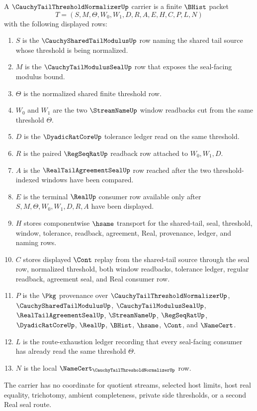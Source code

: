 \begin{definition}
\label{def:cauchy-tail-threshold-normalizer-carrier}
A $\CauchyTailThresholdNormalizerUp$ carrier is a finite $\BHist$ packet
$$
T=(S,M,\Theta,W_0,W_1,D,R,A,E,H,C,P,L,N)
$$
with the following displayed rows:
\begin{enumerate}
\item $S$ is the $\CauchySharedTailModulusUp$ row naming the shared tail source whose threshold is being normalized.
\item $M$ is the $\CauchyTailModulusSealUp$ row that exposes the seal-facing modulus bound.
\item $\Theta$ is the normalized shared finite threshold row.
\item $W_0$ and $W_1$ are the two $\StreamNameUp$ window readbacks cut from the same threshold $\Theta$.
\item $D$ is the $\DyadicRatCoreUp$ tolerance ledger read on the same threshold.
\item $R$ is the paired $\RegSeqRatUp$ readback row attached to $W_0,W_1,D$.
\item $A$ is the $\RealTailAgreementSealUp$ row reached after the two threshold-indexed windows have been compared.
\item $E$ is the terminal $\RealUp$ consumer row available only after $S,M,\Theta,W_0,W_1,D,R,A$ have been displayed.
\item $H$ stores componentwise $\hsame$ transport for the shared-tail, seal, threshold, window, tolerance, readback, agreement, Real, provenance, ledger, and naming rows.
\item $C$ stores displayed $\Cont$ replay from the shared-tail source through the seal row, normalized threshold, both window readbacks, tolerance ledger, regular readback, agreement seal, and Real consumer row.
\item $P$ is the $\Pkg$ provenance over $\CauchyTailThresholdNormalizerUp$, $\CauchySharedTailModulusUp$, $\CauchyTailModulusSealUp$, $\RealTailAgreementSealUp$, $\StreamNameUp$, $\RegSeqRatUp$, $\DyadicRatCoreUp$, $\RealUp$, $\BHist$, $\hsame$, $\Cont$, and $\NameCert$.
\item $L$ is the route-exhaustion ledger recording that every seal-facing consumer has already read the same threshold $\Theta$.
\item $N$ is the local $\NameCert_{\CauchyTailThresholdNormalizerUp}$ row.
\end{enumerate}
The carrier has no coordinate for quotient streams, selected host limits, host real equality, trichotomy, ambient completeness, private side thresholds, or a second Real seal route.
\end{definition}

